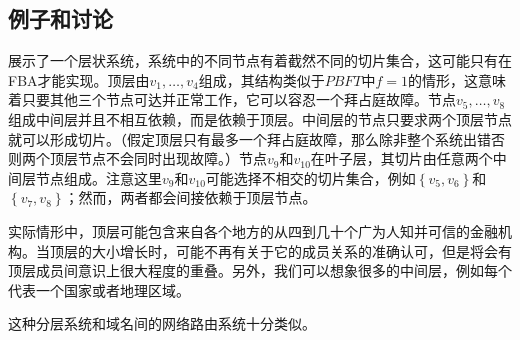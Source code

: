 \subsection{例子和讨论}
展示了一个层状系统，系统中的不同节点有着截然不同的切片集合，这可能只有在FBA才能实现。顶层由$v_1,\ldots,v_4$组成，其结构类似于$PBFT$中$f=1$的情形，这意味着只要其他三个节点可达并正常工作，它可以容忍一个拜占庭故障。节点$v_5,\ldots,v_8$组成中间层并且不相互依赖，而是依赖于顶层。中间层的节点只要求两个顶层节点就可以形成切片。（假定顶层只有最多一个拜占庭故障，那么除非整个系统出错否则两个顶层节点不会同时出现故障。）节点$v_9$和$v_10$在叶子层，其切片由任意两个中间层节点组成。注意这里$v_9$和$v_10$可能选择不相交的切片集合，例如$\left\{v_5,v_6\right\}$和$\left\{v_7,v_8\right\}$；然而，两者都会间接依赖于顶层节点。

实际情形中，顶层可能包含来自各个地方的从四到几十个广为人知并可信的金融机构。当顶层的大小增长时，可能不再有关于它的成员关系的准确认可，但是将会有顶层成员间意识上很大程度的重叠。另外，我们可以想象很多的中间层，例如每个代表一个国家或者地理区域。

这种分层系统和域名间的网络路由系统十分类似。
